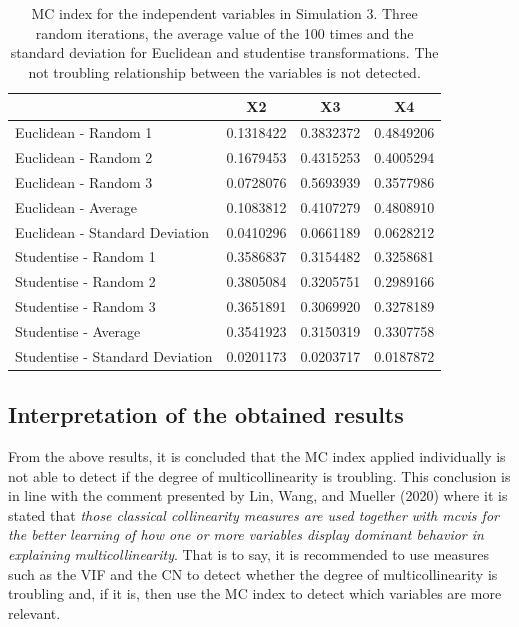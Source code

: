 \begin{table}

\caption{\label{tab:Simulation3randomlatex}MC index for the independent variables in Simulation 3. Three random iterations, the average value of the 100 times and the standard deviation for Euclidean and studentise transformations. The not troubling relationship between the variables is not detected.}
\centering
\begin{tabular}[t]{l|c|c|c}
\hline
  & X2 & X3 & X4\\
\hline
Euclidean - Random 1 & 0.1318422 & 0.3832372 & 0.4849206\\
\hline
Euclidean - Random 2 & 0.1679453 & 0.4315253 & 0.4005294\\
\hline
Euclidean - Random 3 & 0.0728076 & 0.5693939 & 0.3577986\\
\hline
Euclidean - Average & 0.1083812 & 0.4107279 & 0.4808910\\
\hline
Euclidean - Standard Deviation & 0.0410296 & 0.0661189 & 0.0628212\\
\hline
Studentise - Random 1 & 0.3586837 & 0.3154482 & 0.3258681\\
\hline
Studentise - Random 2 & 0.3805084 & 0.3205751 & 0.2989166\\
\hline
Studentise - Random 3 & 0.3651891 & 0.3069920 & 0.3278189\\
\hline
Studentise - Average & 0.3541923 & 0.3150319 & 0.3307758\\
\hline
Studentise - Standard Deviation & 0.0201173 & 0.0203717 & 0.0187872\\
\hline
\end{tabular}
\end{table}

\hypertarget{interpretation-of-the-obtained-results}{%
\subsection{Interpretation of the obtained results}\label{interpretation-of-the-obtained-results}}

From the above results, it is concluded that the MC index applied individually is not able to detect if the degree of multicollinearity is troubling. This conclusion is in line with the comment presented by Lin, Wang, and Mueller (2020) where it is stated that \emph{those classical collinearity measures are used together with mcvis for the better learning of how one or more variables display dominant behavior in explaining multicollinearity}. That is to say, it is recommended to use measures such as the VIF and the CN to detect whether the degree of multicollinearity is troubling and, if it is, then use the MC index to detect which variables are more relevant.

